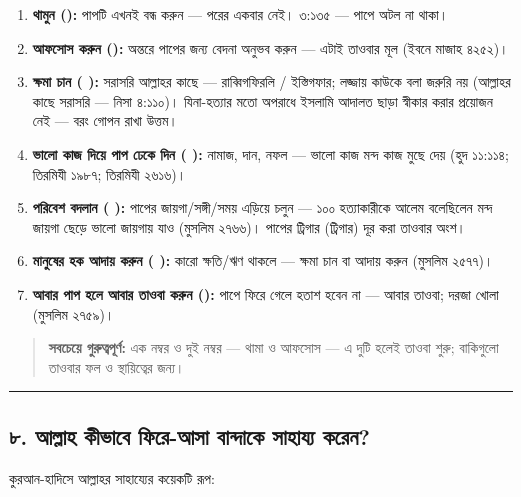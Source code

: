 \begin{enumerate}
\item \textbf{থামুন ():} পাপটি এখনই বন্ধ করুন — পরের একবার নেই। ৩:১৩৫ — পাপে অটল না থাকা।
\item \textbf{আফসোস করুন ():} অন্তরে পাপের জন্য বেদনা অনুভব করুন — এটাই তাওবার মূল (ইবনে মাজাহ ৪২৫২)।
\item \textbf{ক্ষমা চান ( ):} সরাসরি আল্লাহর কাছে — রাব্বিগফিরলি / ইস্তিগফার; লজ্জায় কাউকে বলা জরুরি নয় (আল্লাহর কাছে সরাসরি — নিসা ৪:১১০)। যিনা-হত্যার মতো অপরাধে ইসলামি আদালত ছাড়া স্বীকার করার প্রয়োজন নেই — বরং গোপন রাখা উত্তম।
\item \textbf{ভালো কাজ দিয়ে পাপ ঢেকে দিন (  ):} নামাজ, দান, নফল — ভালো কাজ মন্দ কাজ মুছে দেয় (হুদ ১১:১১৪; তিরমিযী ১৯৮৭; তিরমিযী ২৬১৬)।
\item \textbf{পরিবেশ বদলান (  ):} পাপের জায়গা/সঙ্গী/সময় এড়িয়ে চলুন — ১০০ হত্যাকারীকে আলেম বলেছিলেন মন্দ জায়গা ছেড়ে ভালো জায়গায় যাও (মুসলিম ২৭৬৬)। পাপের ট্রিগার (ট্রিগার) দূর করা তাওবার অংশ।
\item \textbf{মানুষের হক আদায় করুন ( ):} কারো ক্ষতি/ঋণ থাকলে — ক্ষমা চান বা আদায় করুন (মুসলিম ২৫৭৭)।
\item \textbf{আবার পাপ হলে আবার তাওবা করুন ():} পাপে ফিরে গেলে হতাশ হবেন না — আবার তাওবা; দরজা খোলা (মুসলিম ২৭৫৯)।
\end{enumerate}
\begin{quote}
\textbf{সবচেয়ে গুরুত্বপূর্ণ:} এক নম্বর ও দুই নম্বর — থামা ও আফসোস — এ দুটি হলেই তাওবা শুরু; বাকিগুলো তাওবার ফল ও স্থায়িত্বের জন্য।
\end{quote}

\medskip\hrule\medskip

\subsection*{৮. আল্লাহ কীভাবে ফিরে-আসা বান্দাকে সাহায্য করেন?}

কুরআন-হাদিসে আল্লাহর সাহায্যের কয়েকটি রূপ:

